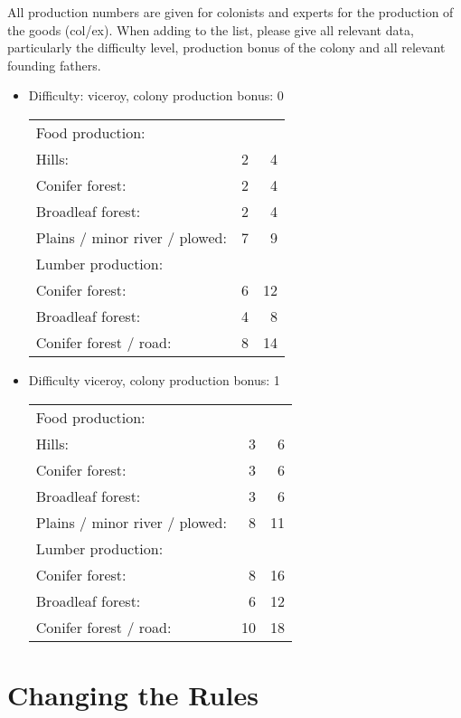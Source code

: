 \documentclass[12pt]{book}
\begin{document}
All production numbers are given for colonists and experts for the
production of the goods (col/ex). When adding to the list, please give
all relevant data, particularly the difficulty level, production bonus
of the colony and all relevant founding fathers.

\begin{itemize}

\item Difficulty: viceroy, colony production bonus: 0

\begin{tabular}{lr@{ / }r}
Food production:\\

Hills: & 2 & 4\\
Conifer forest: & 2 & 4\\
Broadleaf forest: & 2 & 4\\
\bigskip
Plains / minor river / plowed: & 7 & 9\\


Lumber production:\\

Conifer forest: & 6 & 12\\
Broadleaf forest: & 4 & 8\\
Conifer forest / road: & 8 & 14\\
\end{tabular}


\item Difficulty viceroy, colony production bonus: 1

\begin{tabular}{lr@{ / }r}
Food production:\\

Hills: & 3 & 6\\
Conifer forest: & 3 & 6\\
Broadleaf forest: & 3 & 6\\
\bigskip
Plains / minor river / plowed: & 8 & 11\\

Lumber production:\\

Conifer forest: & 8 & 16\\
Broadleaf forest: & 6 & 12\\
Conifer forest / road: & 10 & 18\\
\end{tabular}

\end{itemize}



\hypertarget{Changing the Rules}{\chapter{Changing the Rules}}
\end{document}
